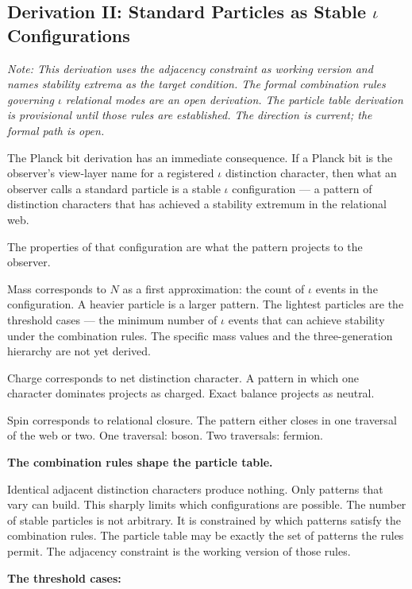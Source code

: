 \documentclass[11pt,letterpaper]{article}
\begin{document}
\subsection{Derivation II: Standard Particles as Stable \(\iota\) Configurations}
\label{sec:orge40e31d}

\emph{Note: This derivation uses the adjacency constraint as working version and names stability extrema as the target condition. The formal combination rules governing \(\iota\) relational modes are an open derivation. The particle table derivation is provisional until those rules are established. The direction is current; the formal path is open.}

The Planck bit derivation has an immediate consequence. If a Planck bit is the observer's view-layer name for a registered \(\iota\) distinction character, then what an observer calls a standard particle is a stable \(\iota\) configuration --- a pattern of distinction characters that has achieved a stability extremum in the relational web.

The properties of that configuration are what the pattern projects to the observer.

Mass corresponds to \(N\) as a first approximation: the count of \(\iota\) events in the configuration. A heavier particle is a larger pattern. The lightest particles are the threshold cases --- the minimum number of \(\iota\) events that can achieve stability under the combination rules. The specific mass values and the three-generation hierarchy are not yet derived.

Charge corresponds to net distinction character. A pattern in which one character dominates projects as charged. Exact balance projects as neutral.

Spin corresponds to relational closure. The pattern either closes in one traversal of the web or two. One traversal: boson. Two traversals: fermion.

\textbf{The combination rules shape the particle table.}

Identical adjacent distinction characters produce nothing. Only patterns that vary can build. This sharply limits which configurations are possible. The number of stable particles is not arbitrary. It is constrained by which patterns satisfy the combination rules. The particle table may be exactly the set of patterns the rules permit. The adjacency constraint is the working version of those rules.

\textbf{The threshold cases:}
\end{document}
